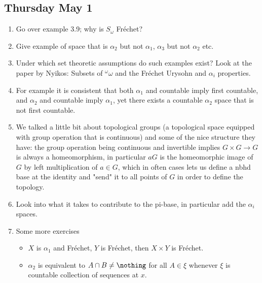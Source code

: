 \documentclass{article}
\begin{document}
\subsection*{Thursday May 1}
\begin{enumerate}
    \item Go over example 3.9; why is \(S_{\omega}\) Fréchet?
    \item Give example of space that is \(\alpha_2\) but not \(\alpha_1\), \(\alpha_3\) but not \(\alpha_2\) etc. 
    \item Under which set theoretic assumptions do such examples exist? Look at the paper by Nyikos: Subsets of \(^\omega \omega\) and the Fréchet Urysohn and \(\alpha_i\) properties. 
    
    \item For example it is consistent that both \(\alpha_1\) and countable imply first countable, and \(\alpha_2\) and countable imply  \(\alpha_1\), yet there exists a countable \(\alpha_2\) space that is not first countable.

    \item We talked a little bit about topological groups (a topological space equipped with group operation that is continuous) and some of the nice structure they have: the group operation being continuous and invertible implies \(G\times G \to G\) is always a homeomorphism, in particular \(aG\) is the homeomorphic image of \(G\) by left multiplication of \(a \in G\), which in often cases lets us define a nbhd base at the identity and "send" it to all points of \(G\) in order to define the topology.
    \item Look into what it takes to contribute to the pi-base, in particular add the \(\alpha_i\) spaces.
    \item Some more exercises 
    \begin{itemize}
        \item \(X\) is \(\alpha_1\) and Fréchet, \(Y\) is Fréchet, then \(X \times Y\) is Fréchet.
        \item \(\alpha_2\) is equivalent to \(A \cap B \neq \nothing\) for all \(A \in \xi\) whenever \(\xi\) is countable collection of sequences at \(x\). \checkmark
    \end{itemize}
\end{enumerate}
\end{document}
